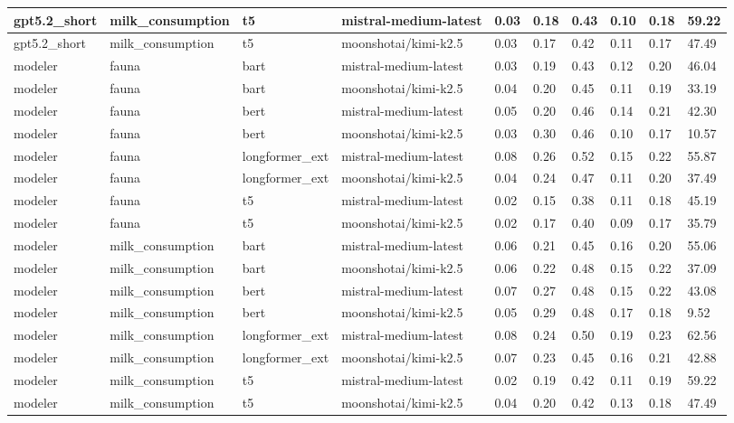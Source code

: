 \begin{tabular}{|l|l|l|l|l|l|l|l|l|l|}
 \hline
 gpt5.2\_short & milk\_consumption & t5 & mistral-medium-latest & 0.03 & 0.18 & 0.43 & 0.10 & 0.18 & 59.22 \\
 \hline
 gpt5.2\_short & milk\_consumption & t5 & moonshotai/kimi-k2.5 & 0.03 & 0.17 & 0.42 & 0.11 & 0.17 & 47.49 \\
 \hline
 modeler & fauna & bart & mistral-medium-latest & 0.03 & 0.19 & 0.43 & 0.12 & 0.20 & 46.04 \\
 \hline
 modeler & fauna & bart & moonshotai/kimi-k2.5 & 0.04 & 0.20 & 0.45 & 0.11 & 0.19 & 33.19 \\
 \hline
 modeler & fauna & bert & mistral-medium-latest & 0.05 & 0.20 & 0.46 & 0.14 & 0.21 & 42.30 \\
 \hline
 modeler & fauna & bert & moonshotai/kimi-k2.5 & 0.03 & 0.30 & 0.46 & 0.10 & 0.17 & 10.57 \\
 \hline
 modeler & fauna & longformer\_ext & mistral-medium-latest & 0.08 & 0.26 & 0.52 & 0.15 & 0.22 & 55.87 \\
 \hline
 modeler & fauna & longformer\_ext & moonshotai/kimi-k2.5 & 0.04 & 0.24 & 0.47 & 0.11 & 0.20 & 37.49 \\
 \hline
 modeler & fauna & t5 & mistral-medium-latest & 0.02 & 0.15 & 0.38 & 0.11 & 0.18 & 45.19 \\
 \hline
 modeler & fauna & t5 & moonshotai/kimi-k2.5 & 0.02 & 0.17 & 0.40 & 0.09 & 0.17 & 35.79 \\
 \hline
 modeler & milk\_consumption & bart & mistral-medium-latest & 0.06 & 0.21 & 0.45 & 0.16 & 0.20 & 55.06 \\
 \hline
 modeler & milk\_consumption & bart & moonshotai/kimi-k2.5 & 0.06 & 0.22 & 0.48 & 0.15 & 0.22 & 37.09 \\
 \hline
 modeler & milk\_consumption & bert & mistral-medium-latest & 0.07 & 0.27 & 0.48 & 0.15 & 0.22 & 43.08 \\
 \hline
 modeler & milk\_consumption & bert & moonshotai/kimi-k2.5 & 0.05 & 0.29 & 0.48 & 0.17 & 0.18 & 9.52 \\
 \hline
 modeler & milk\_consumption & longformer\_ext & mistral-medium-latest & 0.08 & 0.24 & 0.50 & 0.19 & 0.23 & 62.56 \\
 \hline
 modeler & milk\_consumption & longformer\_ext & moonshotai/kimi-k2.5 & 0.07 & 0.23 & 0.45 & 0.16 & 0.21 & 42.88 \\
 \hline
 modeler & milk\_consumption & t5 & mistral-medium-latest & 0.02 & 0.19 & 0.42 & 0.11 & 0.19 & 59.22 \\
 \hline
 modeler & milk\_consumption & t5 & moonshotai/kimi-k2.5 & 0.04 & 0.20 & 0.42 & 0.13 & 0.18 & 47.49 \\
\hline
\end{tabular}
